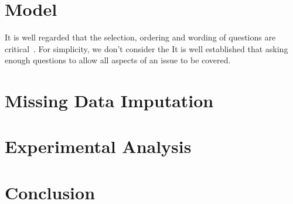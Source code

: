 \documentclass{llncs}
\begin{document}
\section{Model}
 It is well regarded that the selection, ordering and wording of questions are critical~\cite{}. For simplicity, we don't consider the 
It is well established that asking enough questions to allow all aspects of an issue to be covered. 


\section{Missing Data Imputation}








\section{Experimental Analysis}




\section{Conclusion}
\end{document}
